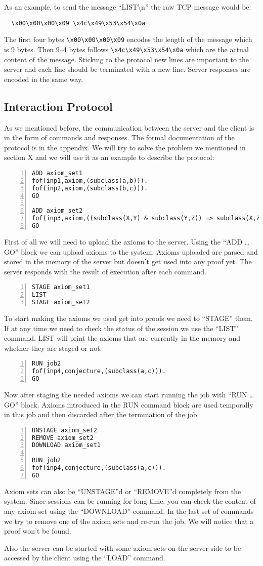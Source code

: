 As an example, to send the message ``LIST\textbackslash{}n'' the raw TCP message would be:
\begin{lstlisting}
  \x00\x00\x00\x09 \x4c\x49\x53\x54\x0a
\end{lstlisting}
The first four bytes \lstinline{\x00\x00\x00\x09} encodes the length of the message which is 9 bytes. Then 9--4 bytes follows \lstinline{\x4c\x49\x53\x54\x0a} which are the actual content of the message. Sticking to the protocol new lines are important to the server and each line should be terminated with a new line. Server responses are encoded in the same way.

\subsection{Interaction Protocol}\label{subsec:interactionProtocol}
As we mentioned before, the communication between the server and the client is in the form of commands and responses. The formal documentation of the protocol is in the appendix. We will try to solve the problem we mentioned in section X and we will use it as an example to describe the protocol:
\begin{lstlisting}[numbers=left]
ADD axiom_set1
fof(inp1,axiom,(subclass(a,b))).
fof(inp2,axiom,(subclass(b,c))).
GO

ADD axiom_set2
fof(inp3,axiom,((subclass(X,Y) & subclass(Y,Z)) => subclass(X,Z))).
GO
\end{lstlisting}
First of all we will need to upload the axioms to the server. Using the ``ADD \ldots GO'' block we can upload axioms to the system. Axioms uploaded are parsed and stored in the memory of the server but doesn't get used into any proof yet. The server responds with the result of execution after each command.
\begin{lstlisting}[numbers=left]
STAGE axiom_set1
LIST
STAGE axiom_set2
\end{lstlisting}
To start making the axioms we used get into proofs we need to ``STAGE'' them. If at any time we need to check the status of the session we use the ``LIST'' command. LIST will print the axioms that are currently in the memory and whether they are staged or not.
\begin{lstlisting}[numbers=left]
RUN job2
fof(inp4,conjecture,(subclass(a,c))).
GO
\end{lstlisting}
Now after staging the needed axioms we can start running the job with ``RUN \ldots GO'' block. Axioms introduced in the RUN command block are used temporally in this job and then discarded after the termination of the job.
\begin{lstlisting}[numbers=left]
UNSTAGE axiom_set2
REMOVE axiom_set2
DOWNLOAD axiom_set1

RUN job2
fof(inp4,conjecture,(subclass(a,c))).
GO
\end{lstlisting}
Axiom sets can also be ``UNSTAGE''d or ``REMOVE''d completely from the system. Since sessions can be running for long time, you can check the content of any axiom set using the ``DOWNLOAD'' command. In the last set of commands we try to remove one of the axiom sets and re-run the job. We will notice that a proof won't be found.

Also the server can be started with some axiom sets on the server side to be accessed by the client using the ``LOAD'' command.
